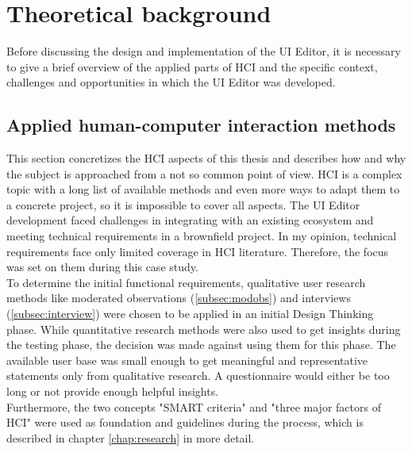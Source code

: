 
%
\chapter{Theoretical background}
\label{chap:background}

Before discussing the design and implementation of the UI Editor, it is necessary to give a brief overview of the applied parts of HCI and the specific context, challenges and opportunities in which the UI Editor was developed.
% 

\section{Applied human-computer interaction methods}

This section concretizes the HCI aspects of this thesis and describes how and why the subject is approached from a not so common point of view.
HCI is a complex topic with a long list of available methods and even more ways to adapt them to a concrete project, so it is impossible to cover all aspects.
The UI Editor development faced challenges in integrating with an existing ecosystem and meeting technical requirements in a \gls{brownfield} project.
In my opinion, technical requirements face only limited coverage in HCI literature.
Therefore, the focus was set on them during this case study.
\\
To determine the initial functional requirements, qualitative user research methods like moderated observations (\ref{subsec:modobs}) and interviews (\ref{subsec:interview}) were chosen to be applied in an initial Design Thinking phase.
While quantitative research methods were also used to get insights during the testing phase, the decision was made against using them for this phase.
The available user base was small enough to get meaningful and representative statements only from qualitative research.
A questionnaire would either be too long or not provide enough helpful insights.
\\
Furthermore, the two concepts "SMART criteria" and "three major factors of HCI" were used as foundation and guidelines during the process, which is described in chapter \ref{chap:research} in more detail.

